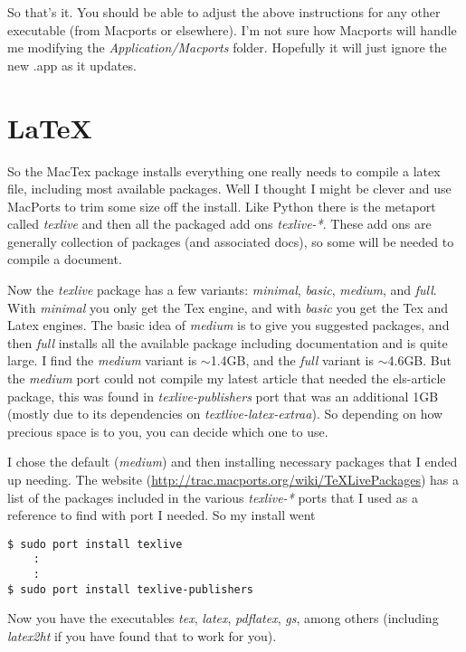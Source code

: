 \documentclass[11pt, A4paper]{article}
\begin{document}
So that's it. You should be able to adjust the above instructions for any other executable (from Macports or elsewhere). I'm not sure how Macports will handle me modifying the {\it Application/Macports} folder. Hopefully it will just ignore the new .app as it updates.


%




%
%
\section{\LaTeX}
So the MacTex package installs everything one really needs to compile a latex file, including most available packages. Well I thought I might be clever and use MacPorts to trim some size off the install. Like Python there is the metaport called \textit{texlive} and then all the packaged add ons \textit{texlive-*}. These add ons are generally collection of packages (and associated docs), so some will be needed to compile a document. 

Now the \textit{texlive} package has a few variants: \textit{minimal}, \textit{basic}, \textit{medium}, and \textit{full}. With \textit{minimal} you only get the Tex engine, and with \textit{basic} you get the Tex and Latex engines. The basic idea of \textit{medium} is to give you suggested packages, and then \textit{full} installs all the available package including documentation and is quite large. I find the \textit{medium} variant is $\sim$1.4GB, and the \textit{full} variant is $\sim$4.6GB. But the \textit{medium} port could not compile my latest article that needed the els-article package, this was found in \textit{texlive-publishers} port that was an additional 1GB (mostly due to its dependencies on \textit{textlive-latex-extraa}). So depending on how precious space is to you, you can decide which one to use. 

I chose the default (\textit{medium}) and then installing necessary packages that I ended up needing. The website (\url{http://trac.macports.org/wiki/TeXLivePackages}) has a list of the packages included in the various \textit{texlive-*} ports that I used as a reference to find with port I needed. So my install went
\begin{lstlisting}[style=Bash]
$ sudo port install texlive
	:
	:
$ sudo port install texlive-publishers
\end{lstlisting}
Now you have the executables \textit{tex}, \textit{latex}, \textit{pdflatex}, \textit{gs}, among others (including \textit{latex2ht} if you have found that to work for you). 
\end{document}
